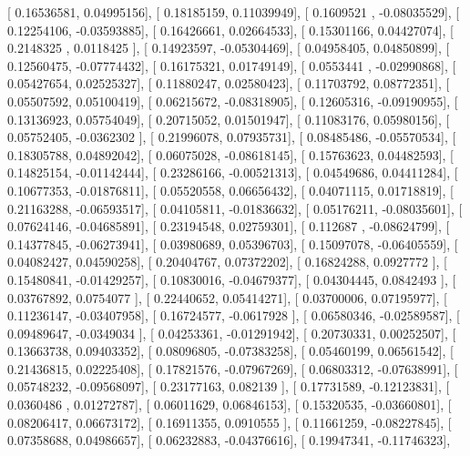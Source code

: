 \documentclass{article}
\begin{document}
       [ 0.16536581,  0.04995156],
       [ 0.18185159,  0.11039949],
       [ 0.1609521 , -0.08035529],
       [ 0.12254106, -0.03593885],
       [ 0.16426661,  0.02664533],
       [ 0.15301166,  0.04427074],
       [ 0.2148325 ,  0.0118425 ],
       [ 0.14923597, -0.05304469],
       [ 0.04958405,  0.04850899],
       [ 0.12560475, -0.07774432],
       [ 0.16175321,  0.01749149],
       [ 0.0553441 , -0.02990868],
       [ 0.05427654,  0.02525327],
       [ 0.11880247,  0.02580423],
       [ 0.11703792,  0.08772351],
       [ 0.05507592,  0.05100419],
       [ 0.06215672, -0.08318905],
       [ 0.12605316, -0.09190955],
       [ 0.13136923,  0.05754049],
       [ 0.20715052,  0.01501947],
       [ 0.11083176,  0.05980156],
       [ 0.05752405, -0.0362302 ],
       [ 0.21996078,  0.07935731],
       [ 0.08485486, -0.05570534],
       [ 0.18305788,  0.04892042],
       [ 0.06075028, -0.08618145],
       [ 0.15763623,  0.04482593],
       [ 0.14825154, -0.01142444],
       [ 0.23286166, -0.00521313],
       [ 0.04549686,  0.04411284],
       [ 0.10677353, -0.01876811],
       [ 0.05520558,  0.06656432],
       [ 0.04071115,  0.01718819],
       [ 0.21163288, -0.06593517],
       [ 0.04105811, -0.01836632],
       [ 0.05176211, -0.08035601],
       [ 0.07624146, -0.04685891],
       [ 0.23194548,  0.02759301],
       [ 0.112687  , -0.08624799],
       [ 0.14377845, -0.06273941],
       [ 0.03980689,  0.05396703],
       [ 0.15097078, -0.06405559],
       [ 0.04082427,  0.04590258],
       [ 0.20404767,  0.07372202],
       [ 0.16824288,  0.0927772 ],
       [ 0.15480841, -0.01429257],
       [ 0.10830016, -0.04679377],
       [ 0.04304445,  0.0842493 ],
       [ 0.03767892,  0.0754077 ],
       [ 0.22440652,  0.05414271],
       [ 0.03700006,  0.07195977],
       [ 0.11236147, -0.03407958],
       [ 0.16724577, -0.0617928 ],
       [ 0.06580346, -0.02589587],
       [ 0.09489647, -0.0349034 ],
       [ 0.04253361, -0.01291942],
       [ 0.20730331,  0.00252507],
       [ 0.13663738,  0.09403352],
       [ 0.08096805, -0.07383258],
       [ 0.05460199,  0.06561542],
       [ 0.21436815,  0.02225408],
       [ 0.17821576, -0.07967269],
       [ 0.06803312, -0.07638991],
       [ 0.05748232, -0.09568097],
       [ 0.23177163,  0.082139  ],
       [ 0.17731589, -0.12123831],
       [ 0.0360486 ,  0.01272787],
       [ 0.06011629,  0.06846153],
       [ 0.15320535, -0.03660801],
       [ 0.08206417,  0.06673172],
       [ 0.16911355,  0.0910555 ],
       [ 0.11661259, -0.08227845],
       [ 0.07358688,  0.04986657],
       [ 0.06232883, -0.04376616],
       [ 0.19947341, -0.11746323],
\end{document}

